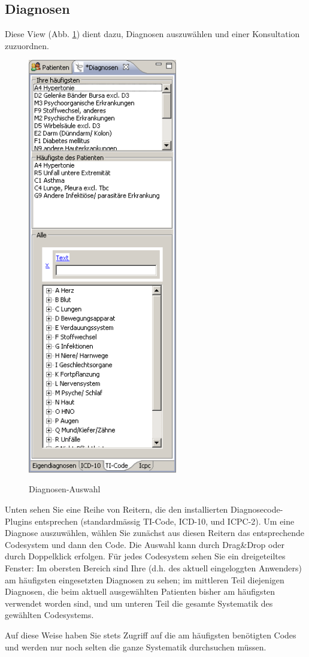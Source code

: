 \subsection{Diagnosen}
\label{view:diagnosen} 
Diese View (Abb. \ref{fig:diagnosen}) dient dazu, Diagnosen auszuwählen und einer Konsultation zuzuordnen.
 \begin{figure}
    \includegraphics[width=6.5cm]{images/diagnosenview}
    \label{fig:diagnosen}
    \caption{Diagnosen-Auswahl}
\end{figure}
Unten sehen Sie eine Reihe von Reitern, die den installierten Diagnosecode-Plugins entsprechen (standardmässig TI-Code, ICD-10, und ICPC-2).
Um eine Diagnose auszuwählen, wählen Sie zunächst aus diesen Reitern das entsprechende Codesystem und dann den Code. Die Auswahl kann durch Drag\&Drop oder durch Doppelklick erfolgen.
Für jedes Codesystem sehen Sie ein dreigeteiltes Fenster: Im obersten Bereich sind Ihre (d.h. des aktuell eingeloggten Anwenders) am häufigsten eingesetzten Diagnosen zu sehen; im mittleren Teil diejenigen Diagnosen, die beim aktuell ausgewählten Patienten bisher am häufigsten verwendet worden sind, und um unteren Teil die gesamte Systematik des gewählten Codesystems.

\medskip

Auf diese Weise haben Sie stets Zugriff auf die am häufigsten benötigten Codes und werden nur noch selten die ganze Systematik durchsuchen müssen.


